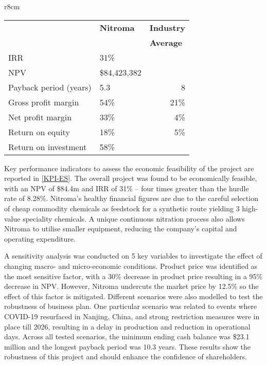 \begin{wraptable}{r}{8cm}
\centering
\caption{Nitroma's KPIs compared to the industry average}
\label{KPI-ES}
\begin{tabular}{l|l|l}
\toprule
           &  \multicolumn{1}{l|}{\textbf{Nitroma}} & \multicolumn{1}{c}{\textbf{Industry}} \\
                     & \multicolumn{1}{l|}{}        & \textbf{Average}                      \\ \midrule

IRR                  & 31\%                         &                              \\
NPV                  & \$84,423,382                 &                              \\
Payback period (years)       & 5.3                          & \multicolumn{1}{r}{8}      \\
Gross profit margin  & 54\%                         & \multicolumn{1}{r}{21\%}   \\
Net profit margin    & 33\%                         & \multicolumn{1}{r}{4\%}    \\
Return on equity     & 18\%                         & \multicolumn{1}{r}{5\%}   \\
Return on investment & 58\%                         &                              \\ \bottomrule
\end{tabular}
\end{wraptable}

Key performance indicators to assess the economic feasibility of the project are reported in \cref{KPI-ES}. The overall project was found to be economically feasible, with an NPV of \$84.4m and IRR of 31\% – four times greater than the hurdle rate of 8.28\%. Nitroma’s healthy financial figures are due to the careful selection of cheap commodity chemicals as feedstock for a synthetic route yielding 3 high-value speciality chemicals. A unique continuous nitration process also allows Nitroma to utilise smaller equipment, reducing the company’s capital and operating expenditure.

A sensitivity analysis was conducted on 5 key variables to investigate the effect of changing macro- and micro-economic conditions. Product price was identified as the most sensitive factor, with a 30\% decrease in product price resulting in a 95\% decrease in NPV. However, Nitroma undercuts the market price by 12.5\% so the effect of this factor is mitigated. Different scenarios were also modelled to test the robustness of business plan. One particular scenario was related to events where COVID-19 resurfaced in Nanjing, China, and strong restriction measures were in place till 2026, resulting in a delay in production and reduction in operational days. Across all tested scenarios, the minimum ending cash balance was \$23.1 million and the longest payback period was 10.3 years. These results show the robustness of this project and should enhance the confidence of shareholders.